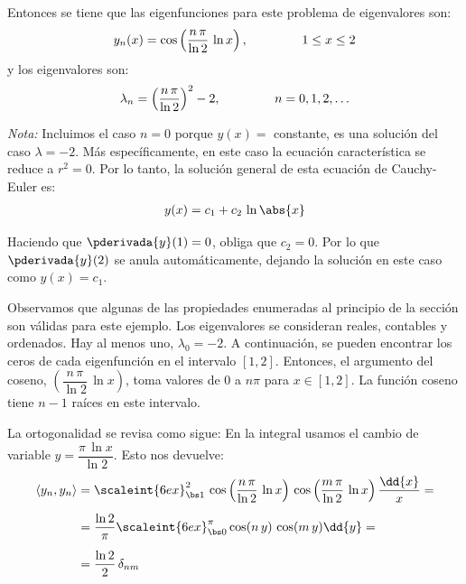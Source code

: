 \begin{ejemplo}
Entonces se tiene que las eigenfunciones para este problema de eigenvalores son:
\begin{align*}
y_{n}(x) = \cos \left( \dfrac{n \, \pi}{\ln 2} \, \ln x \right), \hspace{1.5cm} 1 \leq x \leq 2
\end{align*}
y los eigenvalores son:
\begin{align*}
\lambda_{n} = \left( \dfrac{n \, \pi}{\ln 2} \right)^{2} - 2, \hspace{1.5cm} n = 0, 1, 2, \ldots
\end{align*}

\emph{Nota:} Incluimos el caso $n = 0$ porque $y (x) =$ constante, es una solución del caso $\lambda = - 2$. Más específicamente, en este caso la ecuación característica se reduce a $r^{2} = 0$. Por lo tanto, la solución general de esta ecuación de Cauchy-Euler es:
\begin{align*}
y (x) = c_{1} + c_{2} \, \ln \abs{x}
\end{align*}

Haciendo que $\pderivada{y} (1) = 0$, obliga que $c_{2} = 0$. Por lo que $\pderivada{y} (2)$ se anula automáticamente, dejando la solución en este caso como $y(x) = c_{1}$.
\par
Observamos que algunas de las propiedades enumeradas al principio de la sección son válidas para este ejemplo. Los eigenvalores se consideran reales, contables y ordenados. Hay al menos uno, $\lambda_{0} = -2$. A continuación, se pueden encontrar los ceros de cada eigenfunción en el intervalo $[1, 2]$. Entonces, el argumento del coseno, $\left( \dfrac{n \, \pi}{\ln 2} \, \ln x \right)$, toma valores de $0$ a $n \pi$ para $x \in [1, 2]$. La función coseno tiene $n - 1$ raíces en este intervalo.
\par
La ortogonalidad se revisa como sigue: En la integral usamos el cambio de variable $y = \dfrac{\pi \, \ln x}{\ln 2}$. Esto nos devuelve:
\begin{align}
\begin{aligned}[b]
\langle y_{n}, y_{n} \rangle &= \scaleint{6ex}_{\bs 1}^{2} \, \cos \left( \dfrac{n \, \pi}{\ln 2} \, \ln x \right) \, \cos \left( \dfrac{m \, \pi}{\ln 2} \, \ln x \right) \dfrac{\dd{x}}{x} = \\[0.5em]
&= \dfrac{\ln 2}{\pi} \scaleint{6ex}_{\bs 0}^{\pi} \cos (n \, y) \, \cos (m \, y) \dd{y} = \\[0.5em]
&= \dfrac{\ln 2}{2} \, \delta_{nm}
\end{aligned}
\label{eq:ecuacion_04_16}
\end{align}
\end{ejemplo}

